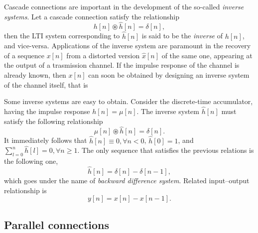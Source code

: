\documentclass[\documentfontsize, twocolumn]{\classname}
\begin{document}
Cascade connections are important in the development of the so-called \emph{inverse systems}. Let a cascade connection satisfy the relationship \[h[n] \circledast \hat h[n] = \delta[n],\] then the LTI system corresponding to $\hat h[n]$ is said to be the \emph{inverse} of $h[n]$, and vice-versa. Applications of the inverse system are paramount in the recovery of a sequence $x[n]$ from a distorted version $\hat x[n]$ of the same one, appearing at the output of a trasmission channel. If the impulse response of the channel is already known, then $x[n]$ can soon be obtained by designing an inverse system of the channel itself, that is

\begin{center}
\end{center}

Some inverse systems are easy to obtain. Consider the discrete-time accumulator, having the impulse response $h[n] = \mu[n]$. The inverse system $\hat h[n]$ must satisfy the following relationship \[\mu[n] \circledast \hat h[n] = \delta[n].\] It immediately follows that $\hat h[n] \equiv 0, \forall n<0$, $\hat h[0] = 1$, and $\sum_{l=0}^n \hat h[l] = 0, \forall n \geq 1$. The only sequence that satisfies the previous relations is the following one,
\begin{equation}\label{eqn:backwardDifferenceSystem}
    \hat h[n] = \delta[n] - \delta[n-1],
\end{equation}
which goes under the name of \emph{backward difference system}. Related input--output relationship is
\[
    y[n] = x[n] - x[n-1].
\]

\subsection{Parallel connections}
\end{document}
